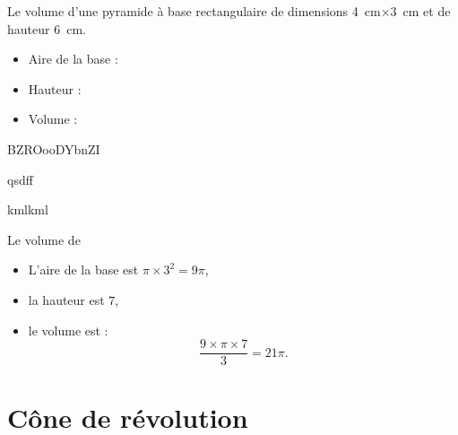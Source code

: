 \begin{example}
    Le volume d'une pyramide à base rectangulaire de dimensions \SI{4}{\centi\meter}\( \times\)\SI{3}{\centi\meter} et de hauteur \SI{6}{\centi\meter}.

\begin{itemize}
    \item 
        Aire de la base : 
    \item
        Hauteur : 
    \item
        Volume :
\end{itemize}

\begin{center}         
                                                                  
\end{center}


BZROooDYbnZI

qsdff

\begin{center}
    
\end{center}
kmlkml

\end{example}

\begin{example}
    Le volume de
\begin{center}
   
\end{center}

\begin{itemize}
    \item L'aire de la base est \( \pi\times 3^2=9\pi\),
    \item la hauteur est \( 7\),
    \item le volume est :
        \begin{equation}
            \frac{ 9\times \pi\times 7 }{ 3 }=21\pi.
        \end{equation}
\end{itemize}
\end{example}




\section{Cône de révolution}

